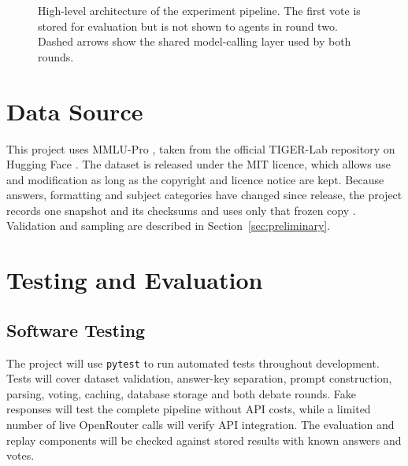 \documentclass[12pt,a4paper]{article}
\begin{document}
\begin{figure}[htbp]
{%
    }

    \caption{High-level architecture of the experiment pipeline. The first vote
    is stored for evaluation but is not shown to agents in round two. Dashed
    arrows show the shared model-calling layer used by both rounds.}
    \label{fig:pipeline}
\end{figure}

\section{Data Source}
\label{sec:datasource}

This project uses MMLU-Pro \citep{wang2024mmlupro}, taken from the official
TIGER-Lab repository on Hugging Face \citep{tigerlab2024mmluprodata}. The
dataset is released under the MIT licence, which allows use and modification as
long as the copyright and licence notice are kept. Because answers, formatting
and subject categories have changed since release, the project records one
snapshot and its checksums and uses only that frozen copy
\citep{tigerlab2024mmluprodata}. Validation and sampling are described in
Section~\ref{sec:preliminary}.

\section{Testing and Evaluation}
\label{sec:testing}

\subsection{Software Testing}

The project will use \texttt{pytest} to run automated tests throughout
development. Tests will cover dataset validation, answer-key separation,
prompt construction, parsing, voting, caching, database storage and both debate
rounds. Fake responses will test the complete pipeline without API costs, while
a limited number of live OpenRouter calls will verify API integration. The
evaluation and replay components will be checked against stored results with
known answers and votes.
\end{document}

